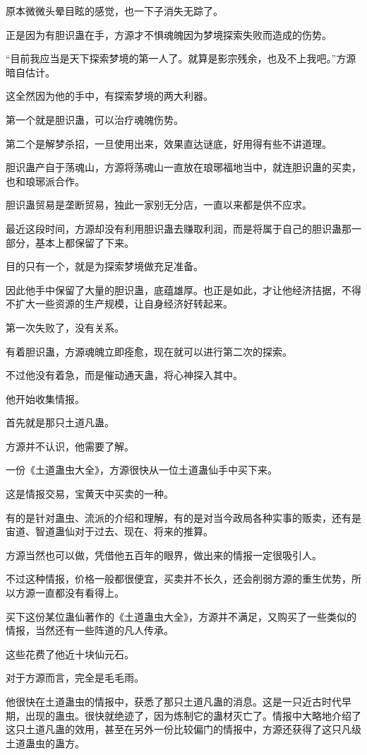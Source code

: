 \begin{this_body}
原本微微头晕目眩的感觉，也一下子消失无踪了。

正是因为有胆识蛊在手，方源才不惧魂魄因为梦境探索失败而造成的伤势。

“目前我应当是天下探索梦境的第一人了。就算是影宗残余，也及不上我吧。”方源暗自估计。

这全然因为他的手中，有探索梦境的两大利器。

第一个就是胆识蛊，可以治疗魂魄伤势。

第二个是解梦杀招，一旦使用出来，效果直达谜底，好用得有些不讲道理。

胆识蛊产自于荡魂山，方源将荡魂山一直放在琅琊福地当中，就连胆识蛊的买卖，也和琅琊派合作。

胆识蛊贸易是垄断贸易，独此一家别无分店，一直以来都是供不应求。

最近这段时间，方源却没有利用胆识蛊去赚取利润，而是将属于自己的胆识蛊那一部分，基本上都保留了下来。

目的只有一个，就是为探索梦境做充足准备。

因此他手中保留了大量的胆识蛊，底蕴雄厚。也正是如此，才让他经济拮据，不得不扩大一些资源的生产规模，让自身经济好转起来。

第一次失败了，没有关系。

有着胆识蛊，方源魂魄立即痊愈，现在就可以进行第二次的探索。

不过他没有着急，而是催动通天蛊，将心神探入其中。

他开始收集情报。

首先就是那只土道凡蛊。

方源并不认识，他需要了解。

一份《土道蛊虫大全》，方源很快从一位土道蛊仙手中买下来。

这是情报交易，宝黄天中买卖的一种。

有的是针对蛊虫、流派的介绍和理解，有的是对当今政局各种实事的贩卖，还有是宙道、智道蛊仙对于过去、现在、将来的推算。

方源当然也可以做，凭借他五百年的眼界，做出来的情报一定很吸引人。

不过这种情报，价格一般都很便宜，买卖并不长久，还会削弱方源的重生优势，所以方源一直都没有看得上。

买下这份某位蛊仙著作的《土道蛊虫大全》，方源并不满足，又购买了一些类似的情报，当然还有一些阵道的凡人传承。

这些花费了他近十块仙元石。

对于方源而言，完全是毛毛雨。

他很快在土道蛊虫的情报中，获悉了那只土道凡蛊的消息。这是一只近古时代早期，出现的蛊虫。很快就绝迹了，因为炼制它的蛊材灭亡了。情报中大略地介绍了这只土道凡蛊的效用，甚至在另外一份比较偏门的情报中，方源还获得了这只凡级土道蛊虫的蛊方。

\end{this_body}

